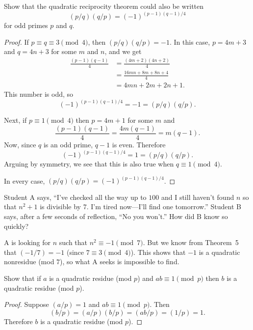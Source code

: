  Show that the quadratic reciprocity theorem could also be
written
\begin{equation*}
  (p/q)(q/p) = (-1)^{(p-1)(q-1)/4}
\end{equation*}
for odd primes $p$ and $q$.
\begin{proof}
  If $p\equiv q\equiv3\pmod4$, then $(p/q)(q/p) = -1$. In this case,
  $p = 4m + 3$ and $q = 4n + 3$ for some $m$ and $n$, and we get
  \begin{align*}
    \frac{(p-1)(q-1)}4
    &= \frac{(4m + 2)(4n + 2)}4 \\
    &= \frac{16mn + 8m + 8n + 4}4 \\
    &= 4mn + 2m + 2n + 1.
  \end{align*}
  This number is odd, so
  \begin{equation*}
    (-1)^{(p-1)(q-1)/4} = -1 = (p/q)(q/p).
  \end{equation*}

  Next, if $p\equiv1\pmod4$ then $p = 4m + 1$ for some $m$ and
  \begin{equation*}
    \frac{(p-1)(q-1)}4 = \frac{4m(q-1)}4 = m(q-1).
  \end{equation*}
  Now, since $q$ is an odd prime, $q-1$ is even. Therefore
  \begin{equation*}
    (-1)^{(p-1)(q-1)/4} = 1 = (p/q)(q/p).
  \end{equation*}
  Arguing by symmetry, we see that this is also true when
  $q\equiv1\pmod4$.

  In every case, $(p/q)(q/p) = (-1)^{(p-1)(q-1)/4}$.
\end{proof}

 Student A says, ``I've checked all the way up to $100$
and I still haven't found $n$ so that $n^2 + 1$ is divisible by
$7$. I'm tired now---I'll find one tomorrow.'' Student B says, after a
few seconds of reflection, ``No you won't.'' How did B know so
quickly?
\begin{solution}
  A is looking for $n$ such that $n^2\equiv-1\pmod7$. But we know from
  Theorem~5 that $(-1/7) = -1$ (since $7\equiv3\pmod4$). This shows
  that $-1$ is a quadratic nonresidue (mod $7$), so what A seeks is
  impossible to find.
\end{solution}

\label{exercise:quad-cong:ab-cong-1-condition-for-b-over-p}
Show that if $a$ is a quadratic residue (mod $p$) and
$ab\equiv1\pmod{p}$ then $b$ is a quadratic residue (mod $p$).
\begin{proof}
  Suppose $(a/p) = 1$ and $ab\equiv1\pmod{p}$. Then
  \begin{equation*}
    (b/p) = (a/p)(b/p) = (ab/p) = (1/p) = 1.
  \end{equation*}
  Therefore $b$ is a quadratic residue (mod $p$).
\end{proof}

